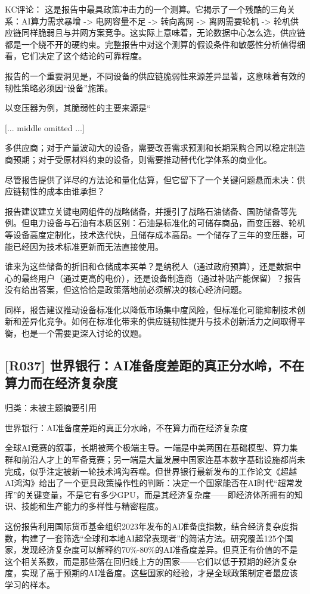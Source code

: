 \documentclass[11pt]{ctexart}
\begin{document}
KC评论： 这是报告中最具政策冲击力的一个测算。它揭示了一个残酷的三角关系：AI算力需求暴增 -> 电网容量不足 -> 转向离网 -> 离网需要轮机 -> 轮机供应链同样脆弱且与并网方案竞争。这实际上意味着，无论数据中心怎么选，供应链都是一个绕不开的硬约束。完整报告中对这个测算的假设条件和敏感性分析值得细看，它们决定了这个结论的可靠程度。

报告的一个重要洞见是，不同设备的供应链脆弱性来源差异显著，这意味着有效的韧性策略必须因“设备”施策。

以变压器为例，其脆弱性的主要来源是“

[... middle omitted ...]

多供应商；对于产量波动大的设备，需要改善需求预测和长期采购合同以稳定制造商预期；对于受原材料约束的设备，则需要推动替代化学体系的商业化。

尽管报告提供了详尽的方法论和量化估算，但它留下了一个关键问题悬而未决：供应链韧性的成本由谁承担？

报告建议建立关键电网组件的战略储备，并援引了战略石油储备、国防储备等先例。但电力设备与石油有本质区别：石油是标准化的可储存商品，而变压器、轮机等设备高度定制化，技术迭代快，且储存成本高昂。一个储存了三年的变压器，可能已经因为技术标准更新而无法直接使用。

谁来为这些储备的折旧和仓储成本买单？是纳税人（通过政府预算），还是数据中心的最终用户（通过更高的电价），还是设备制造商（通过补贴产能保留）？报告没有给出答案，但这恰恰是政策落地前必须解决的核心经济问题。

同样，报告建议推动设备标准化以降低市场集中度风险，但标准化可能抑制技术创新和差异化竞争。如何在标准化带来的供应链韧性提升与技术创新活力之间取得平衡，也是一个需要更深入讨论的议题。

\subsection{[R037] 世界银行：AI准备度差距的真正分水岭，不在算力而在经济复杂度}
{\small\color{refgray}归类：未被主题摘要引用}

世界银行：AI准备度差距的真正分水岭，不在算力而在经济复杂度

全球AI竞赛的叙事，长期被两个极端主导。一端是中美两国在基础模型、算力集群和前沿人才上的军备竞赛；另一端是大量发展中国家连基本数字基础设施都尚未完成，似乎注定被新一轮技术鸿沟吞噬。但世界银行最新发布的工作论文《超越AI鸿沟》给出了一个更具政策操作性的判断：决定一个国家能否在AI时代“超常发挥”的关键变量，不是它有多少GPU，而是其经济复杂度——即经济体所拥有的知识、技能和生产能力的多样性与精密程度。

这份报告利用国际货币基金组织2023年发布的AI准备度指数，结合经济复杂度指数，构建了一套筛选“全球和本地AI超常表现者”的简洁方法。研究覆盖125个国家，发现经济复杂度可以解释约70\%-80\%的AI准备度差异。但真正有价值的不是这个相关系数，而是那些落在回归线上方的国家——它们以低于预期的经济复杂度，实现了高于预期的AI准备度。这些国家的经验，才是全球政策制定者最应该学习的样本。
\end{document}
